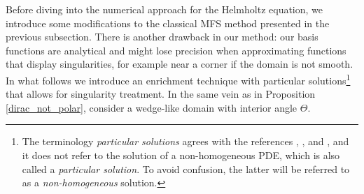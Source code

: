 Before diving into the numerical approach for the Helmholtz equation, we introduce some modifications to the classical \ac{MFS} method presented in the previous subsection. There is another drawback in our method: our basis functions are analytical and might lose precision when approximating functions that display singularities, for example near a corner if the domain is not smooth. In what follows we introduce an enrichment technique with particular solutions\footnote{\label{particular_solutions_footnote} The terminology \textit{particular solutions} agrees with the references \cite{betcke2005reviving}, \cite{antunes2010meshfree}, and \cite{barnett2008stability}, and it does not refer to the solution of a non-homogeneous \ac{PDE}, which is also called a \textit{particular solution}. To avoid confusion, the latter will be referred to as a \textit{non-homogeneous} solution.} that allows for singularity treatment. In the same vein as in Proposition \ref{dirac_not_polar}, consider a wedge-like domain with interior angle \(\Theta\).

